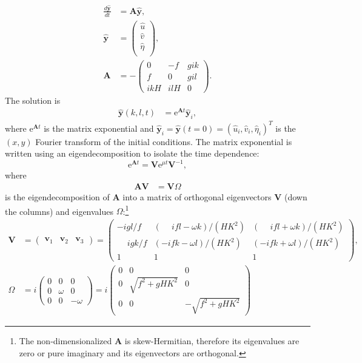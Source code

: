 \documentclass[10pt,reqno]{amsart}
\newcommand{\A}{{\mathbf A}}
\newcommand{\V}{{\mathbf V}}
\newcommand{\Vi}{{\mathbf V}^{-1}}
\newcommand{\vv}{{\mathbf v}}
\newcommand{\y}{{\mathbf y}}
\newcommand{\expe}{{\mathrm e}}
\begin{document}
\begin{align}
\frac{d \hat{\y}}{d t} &= \A \hat{\y} ,  \\
\hat{\y} &= \begin{pmatrix}
\hat{u} \\
\hat{v} \\
\hat{\eta} \\
\end{pmatrix} ,   \\
\A &= -\begin{pmatrix}
0 & - f &  g i k \\
f  & 0 &  g i l \\
i k H &  i l H &  0
\end{pmatrix} .  
\end{align}
The solution is
\begin{align}
\hat\y(k, l, t) & = \expe ^{\A t} \hat\y_i ,  
\end{align}
where $\expe ^{\A t}$ is the matrix exponential and $\hat \y_i = \hat\y (t=0) = ( \hat{u}_i, \hat{v}_i, \hat{\eta}_i) ^T$ is the $(x,y)$ Fourier transform of the initial conditions.
The matrix exponential is written using an eigendecomposition to isolate the time dependence:
\begin{equation}
\expe ^{\A t} = \V \expe ^{\mu t} \Vi ,  
\label{eq:expm_identity}
\end{equation}
where
\begin{align}
\A \V &= \V \Omega   
\label{eq:eigen_decomp}
\end{align}
is the eigendecomposition of $\A$ into a matrix of orthogonal eigenvectors $\V$ (down the columns) and eigenvalues $\Omega$:\footnote{The non-dimensionalized $\A$ is skew-Hermitian, therefore its eigenvalues are zero or pure imaginary and its eigenvectors are orthogonal.}
\begin{align}
\V & = \begin{pmatrix}
\vv_1 & \vv_2 & \vv_3
\end{pmatrix}  = 
\begin{pmatrix}
- i g l / f & (\phantom{-} i f l - \omega k )/(H K^2) & (\phantom{-}i  f l + \omega k )/(H K^2) \\
\phantom{-} i g k / f &  (- i f k - \omega l) /(H K^2) & (- i f k + \omega l )/(H K^2) \\
1 & 1 & 1
\end{pmatrix} ,   \\
\Omega & = i \begin{pmatrix}
0 & 0 & 0 \\
0 & \omega & 0 \\
0 & 0 &-\omega
\end{pmatrix} =
i \begin{pmatrix}
0 & 0 & 0 \\
0 & \sqrt{f^2 + gH K^2} & 0 \\
0 & 0 &- \sqrt{f^2 + gH K^2}
\end{pmatrix}
\end{align}
\end{document}
